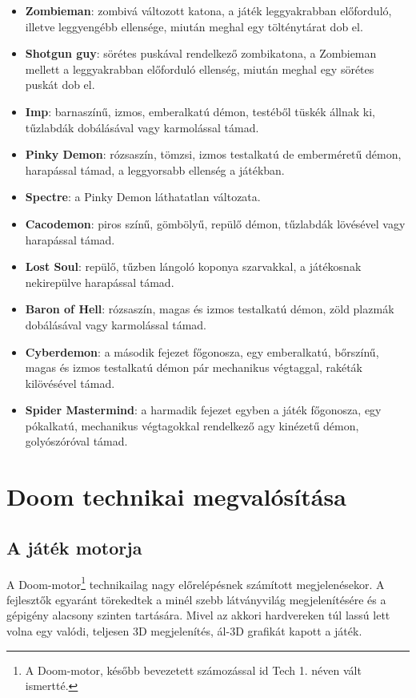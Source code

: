 \documentclass{thesis-ekf}
\theoremstyle{definition}
\begin{document}
\begin{itemize}
    \item \textbf{Zombieman}: zombivá változott katona, a játék leggyakrabban
        előforduló, illetve leggyengébb ellensége, miután meghal egy
        tölténytárat dob el.
    \item \textbf{Shotgun guy}: sörétes puskával rendelkező zombikatona, a
        Zombieman mellett a leggyakrabban előforduló ellenség, miután meghal
        egy sörétes puskát dob el.
    \item \textbf{Imp}: barnaszínű, izmos, emberalkatú démon, testéből tüskék
        állnak ki, tűzlabdák dobálásával vagy karmolással támad.
    \item \textbf{Pinky Demon}: rózsaszín, tömzsi, izmos testalkatú de
        emberméretű démon, harapással támad, a leggyorsabb ellenség a játékban.
    \item \textbf{Spectre}: a Pinky Demon láthatatlan változata.
    \item \textbf{Cacodemon}: piros színű, gömbölyű, repülő démon, tűzlabdák
        lövésével vagy harapással támad.
    \item \textbf{Lost Soul}: repülő, tűzben lángoló koponya szarvakkal, a
        játékosnak nekirepülve harapással támad.
    \item \textbf{Baron of Hell}: rózsaszín, magas és izmos testalkatú démon,
        zöld plazmák dobálásával vagy karmolással támad.
    \item \textbf{Cyberdemon}: a második fejezet főgonosza, egy emberalkatú,
        bőrszínű, magas és izmos testalkatú démon pár mechanikus végtaggal,
        rakéták kilövésével támad.
    \item \textbf{Spider Mastermind}: a harmadik fejezet egyben a játék
        főgonosza, egy pókalkatú, mechanikus végtagokkal rendelkező agy
        kinézetű démon, golyószóróval támad.
\end{itemize}
\cite[Ellenségek]{doomgame}

\chapter{Doom technikai megvalósítása}
\label{chap:engine}

\section{A játék motorja}

A Doom-motor\footnote{A Doom-motor, később bevezetett számozással id Tech 1.
néven vált ismertté.} technikailag nagy előrelépésnek számított megjelenésekor.
A fejlesztők egyaránt törekedtek a minél szebb látványvilág megjelenítésére és a
gépigény alacsony szinten tartására. Mivel az akkori hardvereken túl lassú lett
volna egy valódi, teljesen 3D megjelenítés, ál-3D grafikát kapott a játék.
\cite[A játék motorja]{doomgame}
\end{document}
